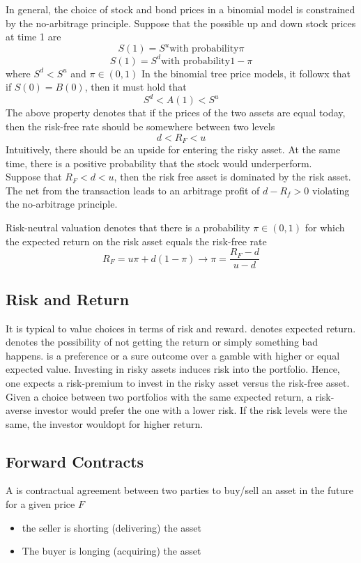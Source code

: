 \documentclass{article}
\begin{document}
In general, the choice of stock and bond prices in a binomial model is constrained by the no-arbitrage principle. Suppose that the possible up and down stock prices at time 1 are $$S(1) = S^{u} \textrm{with probability} \pi$$ $$S(1) = S^{d} \textrm{with probability} 1 - \pi$$ where $S^d < S^u$ and $\pi \in (0,1)$ In the binomial tree price models, it followx that if $S(0) = B(0)$, then it must hold that $$S^d < A(1) < S^u$$ The above property denotes that if the prices of the two assets are equal today, then the risk-free rate should be somewhere between two levels $$d < R_F < u$$ Intuitively, there should be an upside for entering the risky asset. At the same time, there is a positive probability that the stock would underperform. \\ 

Suppose that $R_F < d < u$, then the risk free asset is dominated by the risk asset. The net from the transaction leads to an arbitrage profit of $d- R_f > 0$ violating the no-arbitrage principle. 
\begin{definition}
  Risk-neutral valuation denotes that there is a probability $\pi \in (0,1)$ for which the expected return on the risk asset equals the risk-free rate $$R_F = u \pi + d (1- \pi) \rightarrow \pi = \frac{R_F - d}{u -d}$$
\end{definition}

\subsection{Risk and Return}

It is typical to value choices in terms of risk and reward.  denotes expected return.  denotes the possibility of not getting the return or simply something bad happens.  is a preference or a sure outcome over a gamble with higher or equal expected value. Investing in risky assets induces risk into the portfolio. Hence, one expects a risk-premium to invest in the risky asset versus the risk-free asset. Given a choice between two portfolios with the same expected return, a risk-averse investor would prefer the one with a lower risk. If the risk levels were the same, the investor wouldopt for higher return. 

\subsection{Forward Contracts}

A  is contractual agreement between two parties to buy/sell an asset in the future for a given price $F$ 
\begin{itemize}
  \item the seller is shorting (delivering) the asset 
  \item The buyer is longing (acquiring) the asset
\end{itemize}
\end{document}
